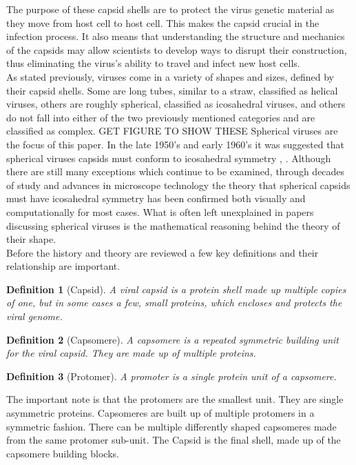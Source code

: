 \documentclass[12pt,letter]{article}
\newtheorem*{definition*}{Definition}
\begin{document}
The purpose of these capsid shells are to protect the virus genetic material as they move from host cell to host cell. This makes the capsid crucial in the infection process. It also means that understanding the structure and mechanics of the capsids may allow scientists to develop ways to disrupt their construction, thus eliminating the virus's ability to travel and infect new host cells. \\

As stated previously, viruses come in a variety of shapes and sizes, defined by their capsid shells. Some are long tubes, similar to a straw, classified as helical viruses, others are roughly spherical, classified as icosahedral viruses, and others do not fall into either of the two previously mentioned categories and are classified as complex. GET FIGURE TO SHOW THESE Spherical viruses are the focus of this paper. In the late 1950's and early 1960's it was suggested that spherical viruses capsids must conform to icosahedral symmetry \cite{Crick:1956}, \cite{Caspar:1962}. Although there are still many exceptions which continue to be examined, through decades of study and advances in microscope technology the theory that spherical capsids must have icosahedral symmetry has been confirmed both visually and computationally for most cases. What is often left unexplained in papers discussing spherical viruses is the mathematical reasoning behind the theory of their shape.\\

Before the history and theory are reviewed a few key definitions and their relationship are important.

\begin{definition*}[Capsid]
A viral capsid is a protein shell made up multiple copies of one, but in some cases a few, small proteins, which encloses and protects the viral genome.
\end{definition*}
\begin{definition*}[Capsomere]
A capsomere is a repeated symmetric building unit for the viral capsid. They are made up of multiple proteins.
\end{definition*}
\begin{definition*}[Protomer]
A promoter is a single protein unit of a capsomere.
\end{definition*}

The important note is that the protomers are the smallest unit. They are single asymmetric proteins. Capsomeres are built up of multiple protomers in a symmetric fashion. There can be multiple differently shaped capsomeres made from the same protomer sub-unit. The Capsid is the final shell, made up of the capsomere building blocks.
\end{document}
